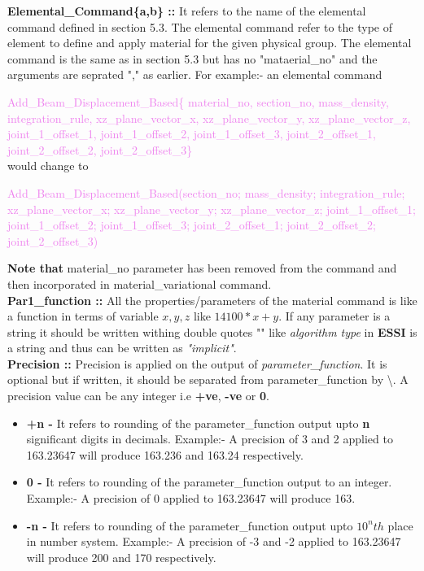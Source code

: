 \documentclass[11pt]{article}
\begin{document}
\noindent \textbf{Elemental\_Command\{a,b\} ::} It refers to the name of the
elemental command defined in section 5.3. The elemental command refer to the
type of element to define and apply material for the given physical group. The
elemental command is the same as in section 5.3 but has no "mataerial_no" and
the arguments are seprated "," as earlier. For example:- an elemental command

\textcolor{violet}{Add\_Beam\_Displacement\_Based\{ material\_no, section\_no,
mass\_density, integration\_rule, xz\_plane\_vector\_x, xz\_plane\_vector\_y,
xz\_plane\_vector\_z, joint\_1\_offset\_1, joint\_1\_offset\_2,
joint\_1\_offset\_3, joint\_2\_offset\_1, joint\_2\_offset\_2,
joint\_2\_offset\_3\}} \\ would change to

\textcolor{violet}{Add\_Beam\_Displacement_Based(section_no; mass\_density;
integration\_rule; xz\_plane\_vector\_x; xz\_plane\_vector\_y; xz\_plane\_vector\_z;
joint\_1\_offset\_1; joint\_1\_offset\_2; joint\_1\_offset\_3; joint\_2\_offset\_1;
joint\_2\_offset\_2; joint\_2\_offset\_3)}  

\noindent \textbf{Note that} material\_no parameter
has been removed from the command and then incorporated in material\_variational command. \\

\noindent \textbf{Par1_function ::} All the properties/parameters of the
material command is like a function in terms of variable $x,y,z$ like
$14100*x+y$. If any parameter is a string it should be written withing double
quotes "" like \textit{algorithm type} in \textbf{ESSI} is a string and thus can
be written as \textit{"implicit"}. \\

\noindent \textbf{Precision ::} Precision is applied on the output of \textit
{parameter\_function}. It is optional but if written, it should be separated
from parameter\_function by \textbackslash. A precision value can be any integer
i.e \textbf{+ve}, \textbf{-ve} or \textbf{0}.

  \begin{itemize} 

    \item \textbf{+n  - } It refers to rounding of the  parameter\_function
    output upto \textbf{n} significant digits in decimals. Example:- A
    precision of 3 and 2 applied to 163.23647 will produce 163.236 and 163.24
    respectively.

    \item \textbf{0  - } It refers to rounding of the  parameter\_function
    output to an integer. Example:- A precision of 0 applied to 163.23647 will
    produce 163.

    \item \textbf{-n  - } It refers to rounding of the  parameter\_function
    output upto {${10^n}th$} place in number system. Example:- A precision of
    -3 and -2 applied to 163.23647 will produce 200 and 170 respectively.

  \end{itemize}
\end{document}
